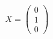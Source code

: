 \documentclass[preview]{standalone}
\begin{document}
\begin{align*}
X = \begin{pmatrix} 0 \\ 1 \\ 0 \end{pmatrix}
\end{align*}
\end{document}
